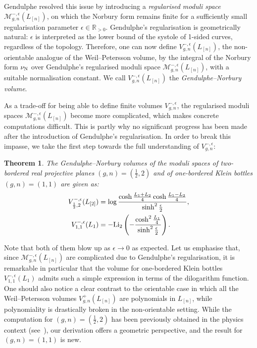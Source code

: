 \documentclass[12pt]{amsart}
\theoremstyle{plain}
\newtheorem{theorem}{Theorem}[section]
\theoremstyle{definition}
\theoremstyle{remark}
\numberwithin{equation}{section}
\begin{document}
Gendulphe \cite{Gen17} resolved this issue by introducing a \emph{regularised moduli space} $\mathcal{M}^{-,\epsilon}_{g,n}(L_{[n]})$, on which the Norbury form remains finite for a sufficiently small regularisation parameter $\epsilon\in\mathbb{R}_{>0}$. Gendulphe's regularisation is geometrically natural: $\epsilon$ is interpreted as the lower bound of the systole of 1-sided curves, regardless of the topology. Therefore, one can now define $V_{g,n}^{-,\epsilon}(L_{[n]})$, the non-orientable analogue of the Weil--Petersson volume, by the integral of the Norbury form $\nu_{\rm N}$ over Gendulphe's regularised moduli space $\mathcal{M}^{-,\epsilon}_{g,n}(L_{[n]})$, with a suitable normalisation constant. We call $V_{g,n}^{-,\epsilon}(L_{[n]})$ the \emph{Gendulphe--Norbury volume}.

As a trade-off for being able to define finite volumes $V_{g,n}^{-,\epsilon}$, the regularised moduli spaces $\mathcal{M}^{-,\epsilon}_{g,n}(L_{[n]})$ become more complicated, which makes concrete computations difficult. This is partly why no significant progress has been made after the introduction of Gendulphe's regularisation. In order to break this impasse, we take the first step towards the full understanding of $V_{g,n}^{-,\epsilon}$:
\begin{theorem} The Gendulphe--Norbury volumes of the moduli spaces of two-bordered real projective planes $(g,n)=(\frac12,2)$ and of one-bordered Klein bottles $(g,n)=(1,1)$ are given as:
\begin{align*}
V_{\frac12,2}^{-,\epsilon}(L_{[2]})&=\log\frac{\cosh\frac{L_1+L_2}{4}\cosh\frac{L_1-L_2}{4}}{\sinh^2\frac{\epsilon}{2}},\\
V_{1,1}^{-,\epsilon}(L_1)&=-{\rm Li}_2\left(-\frac{\cosh^2\frac{L_1}{4}}{\sinh^2\frac{\epsilon}{2}}\right).
\end{align*}
\end{theorem}

Note that both of them blow up as $\epsilon\to0$ as expected. Let us emphasise that, since $\mathcal{M}^{-,\epsilon}_{g,n}(L_{[n]})$ are complicated due to Gendulphe's regularisation, it is remarkable in particular that the volume for one-bordered Klein bottles $V_{1,1}^{-,\epsilon}(L_1)$ admits such a simple expression in terms of the dilogarithm function. One should also notice a clear contrast to the orientable case in which all the Weil--Petersson volumes $V_{g,n}^{+}(L_{[n]})$ are polynomials in $L_{[n]}$, while polynomiality is drastically broken in the non-orientable setting. 
While the computation for $(g,n)=(\frac12,2)$ has been previously obtained in the physics context (see~\cite{Sta23}), our derivation offers a geometric perspective, and the result for $(g,n)=(1,1)$ is new. 
\end{document}

